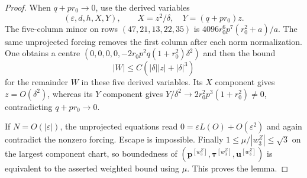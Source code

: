 \documentclass[11pt,a4paper]{article}
\numberwithin{equation}{section}
\theoremstyle{plain}
\theoremstyle{definition}
\theoremstyle{remark}
\begin{document}
\begin{proof}
When $q+pr_0\to0$, use the derived variables
\[
 (\varepsilon,d,h,X,Y),\qquad
 X=z^2/\delta,\quad Y=(q+pr_0)z.
\]
  The five-column minor on rows
$(47,21,13,22,35)$ is
$4096r_0^6p^7(r_0^2+a)/a$.
The same unprojected forcing removes the first column after each norm
normalization.  One obtains a centre
$(0,0,0,0,-2r_0p^2q(1+r_0^2)\delta^2)$ and then the bound
\[
 |W|\le C(|\delta||z|+|\delta|^3)
\]
for the remainder $W$ in these five derived variables. Its $X$ component gives $z=O(\delta^2)$, whereas
its $Y$ component gives
$Y/\delta^2\to2r_0^2p^3(1+r_0^2)\ne0$, contradicting $q+pr_0\to0$.

If $N=O(|\varepsilon|)$, the unprojected equations read
$0=\varepsilon L(O)+O(\varepsilon^2)$ and again contradict the nonzero
forcing.  Escape is impossible.  Finally
$1\le\mu/|w_3^Z|\le\sqrt3$ on the largest component chart, so boundedness
of $(\boldsymbol p^{[w_3^Z]},\boldsymbol\tau^{[w_3^Z]},\boldsymbol u^{[w_3^Z]})$ is equivalent to the asserted weighted bound using $\mu$.
This proves the lemma.
\end{proof}
\end{document}
